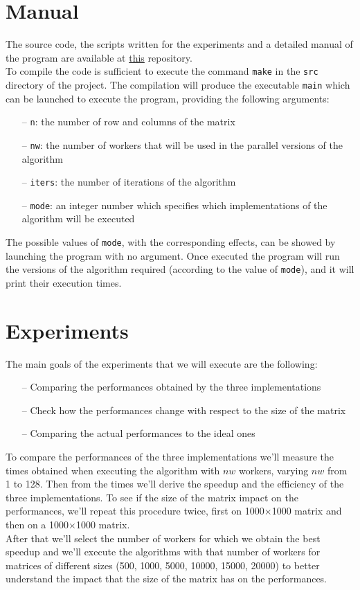 \documentclass[12pt]{article}
\begin{document}
	\section{Manual}
	The source code, the scripts written for the experiments and a detailed manual of the program are available at \href{https://github.com/DiegoArcelli/Parallel-And-Distributed-Systems-Project}{this} repository.\\ 
	To compile the code is sufficient to execute the command \verb*|make| in the \verb*|src| directory of the project. The compilation will produce the executable \verb*|main| which can be launched to execute the program, providing the following arguments:
	\begin{itemize}
		\item[--] \verb|n|: the number of row and columns of the matrix
		\item[--] \verb|nw|: the number of workers that will be used in the parallel versions of the algorithm
		\item[--] \verb|iters|: the number of iterations of the algorithm
		\item[--] \verb|mode|: an integer number which specifies which implementations of the algorithm will be executed
	\end{itemize} 
	The possible values of \verb|mode|, with the corresponding effects, can be showed by launching the program with no argument. Once executed the program will run the versions of the algorithm required (according to the value of \verb|mode|), and it will print their execution times. 
	
	\section{Experiments}
	The main goals of the experiments that we will execute are the following: 
	\begin{itemize}
		\item[--] Comparing the performances obtained by the three implementations 
		\item[--] Check how the performances change with respect to the size of the matrix
		\item[--] Comparing the actual performances to the ideal ones
	\end{itemize}
	To compare the performances of the three implementations we'll measure the times obtained when executing the algorithm with $nw$ workers, varying $nw$ from 1 to 128. Then from the times we'll derive the speedup and the efficiency of the three implementations. To see if the size of the matrix impact on the performances, we'll repeat this procedure twice, first on 1000$\times$1000 matrix and then on a 1000$\times$1000 matrix.\\
	After that we'll select the number of workers for which we obtain the best speedup and we'll execute the algorithms with that number of workers for matrices of different sizes (500, 1000, 5000, 10000, 15000, 20000) to better understand the impact that the size of the matrix has on the performances.\\
	
\end{document}
